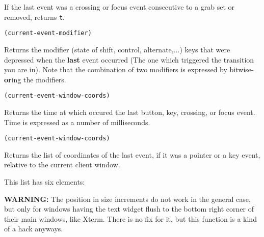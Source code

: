 If the last event was a crossing or focus event consecutive to a grab set or
removed, returns \verb"t".

        
{\usagefont\begin{verbatim}
(current-event-modifier)
\end{verbatim}}\usageupspace

Returns the modifier (state of shift, control, alternate,...) keys that were
depressed when the {\bf last} event occurred (The one which triggered the
transition you are in).  Note that the combination of two modifiers is
expressed by bitwise-{\bf or}ing the modifiers.


{\usagefont\begin{verbatim}
(current-event-window-coords)
\end{verbatim}}\usageupspace

Returns the time at which occured the last button, key, crossing, or focus 
event. Time is expressed as a number of milliseconds.

        
{\usagefont\begin{verbatim}
(current-event-window-coords)
\end{verbatim}}\usageupspace

Returns the list of coordinates of the last event, if it was a
pointer or a key event, relative to the current client window.

This list has six elements:

{\bf WARNING:} The position in size increments do not work in the general
case, but only for windows having the text widget flush to the bottom right
corner of their main windows, like Xterm. There is no fix for it, but this
function is a kind of a hack anyways.

